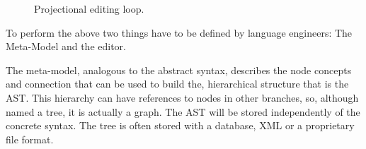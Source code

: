 \begin{figure}[h]
    \centering
    \caption{Projectional editing loop.}
    \label{fig:projectionalEditing_loop}
\end{figure}

To perform the above two things have to be defined by language engineers: The Meta-Model and the editor.

The meta-model, analogous to the abstract syntax, describes the node concepts and connection that can be used to build the, hierarchical structure that is the AST.
This hierarchy can have references to nodes in other branches, so, although named a tree, it is actually a graph.
The AST will be stored independently of the concrete syntax.
The tree is often stored with a database, XML or a proprietary file format.

